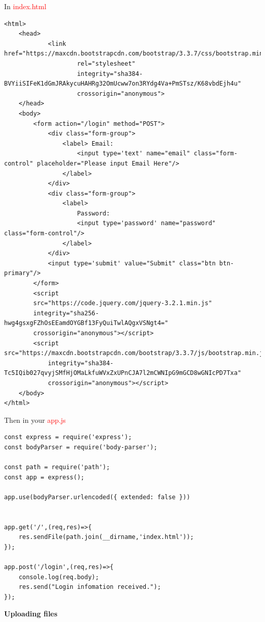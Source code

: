 \documentclass[a4paper]{article}
\begin{document}
In \textcolor{red}{index.html}
\begin{lstlisting}
<html>
    <head>
            <link href="https://maxcdn.bootstrapcdn.com/bootstrap/3.3.7/css/bootstrap.min.css" 
                    rel="stylesheet" 
                    integrity="sha384-BVYiiSIFeK1dGmJRAkycuHAHRg32OmUcww7on3RYdg4Va+PmSTsz/K68vbdEjh4u" 
                    crossorigin="anonymous">
    </head>
    <body>
        <form action="/login" method="POST">
            <div class="form-group">
                <label> Email:
                    <input type='text' name="email" class="form-control" placeholder="Please input Email Here"/>
                </label>
            </div>
            <div class="form-group">
                <label>
                    Password:
                    <input type='password' name="password" class="form-control"/>
                </label>
            </div>
            <input type='submit' value="Submit" class="btn btn-primary"/>
        </form>
        <script
        src="https://code.jquery.com/jquery-3.2.1.min.js"
        integrity="sha256-hwg4gsxgFZhOsEEamdOYGBf13FyQuiTwlAQgxVSNgt4="
        crossorigin="anonymous"></script>
        <script src="https://maxcdn.bootstrapcdn.com/bootstrap/3.3.7/js/bootstrap.min.js" 
            integrity="sha384-Tc5IQib027qvyjSMfHjOMaLkfuWVxZxUPnCJA7l2mCWNIpG9mGCD8wGNIcPD7Txa" 
            crossorigin="anonymous"></script>
    </body>
</html>
\end{lstlisting}
Then in your \textcolor{red}{app.js}
\begin{lstlisting}
const express = require('express');
const bodyParser = require('body-parser');

const path = require('path');
const app = express();

app.use(bodyParser.urlencoded({ extended: false }))


app.get('/',(req,res)=>{
	res.sendFile(path.join(__dirname,'index.html'));
});

app.post('/login',(req,res)=>{
	console.log(req.body);
	res.send("Login infomation received.");
});
\end{lstlisting}

\textbf{Uploading files}\\
\end{document}
